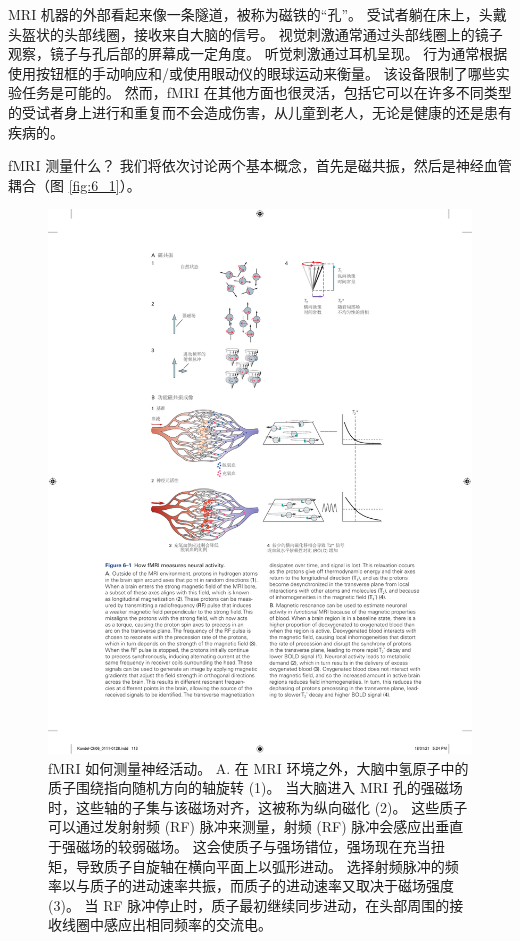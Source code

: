 MRI 机器的外部看起来像一条隧道，被称为磁铁的“孔”。 
受试者躺在床上，头戴头盔状的头部线圈，接收来自大脑的信号。 
视觉刺激通常通过头部线圈上的镜子观察，镜子与孔后部的屏幕成一定角度。 
听觉刺激通过耳机呈现。 
行为通常根据使用按钮框的手动响应和/或使用眼动仪的眼球运动来衡量。 
该设备限制了哪些实验任务是可能的。 
然而，fMRI 在其他方面也很灵活，包括它可以在许多不同类型的受试者身上进行和重复而不会造成伤害，从儿童到老人，无论是健康的还是患有疾病的。


fMRI 测量什么？ 
我们将依次讨论两个基本概念，首先是磁共振，然后是神经血管耦合（图 \ref{fig:6_1}）。

\begin{figure}[htbp]
	\centering
	\includegraphics[width=0.9\linewidth]{chap06/fig_6_1}
	\caption{fMRI 如何测量神经活动。 
		A. 在 MRI 环境之外，大脑中氢原子中的质子围绕指向随机方向的轴旋转 (1)。 
		当大脑进入 MRI 孔的强磁场时，这些轴的子集与该磁场对齐，这被称为纵向磁化 (2)。 
		这些质子可以通过发射射频 (RF) 脉冲来测量，射频 (RF) 脉冲会感应出垂直于强磁场的较弱磁场。 
		这会使质子与强场错位，强场现在充当扭矩，导致质子自旋轴在横向平面上以弧形进动。 
		选择射频脉冲的频率以与质子的进动速率共振，而质子的进动速率又取决于磁场强度 (3)。 
		当 RF 脉冲停止时，质子最初继续同步进动，在头部周围的接收线圈中感应出相同频率的交流电。 
}
\end{figure}
